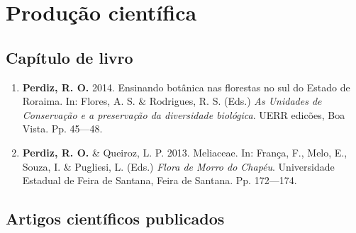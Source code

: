 \documentclass[11pt, a4paper]{awesome-cv}
\begin{document}
\hypertarget{produuxe7uxe3o-cientuxedfica}{%
\section{Produção científica}\label{produuxe7uxe3o-cientuxedfica}}

\hypertarget{capuxedtulo-de-livro}{%
\subsection{Capítulo de livro}\label{capuxedtulo-de-livro}}

\begin{enumerate}
\def\labelenumi{(\arabic{enumi})}
\item
  \textbf{Perdiz, R. O.} 2014. Ensinando botânica nas florestas no sul do Estado de Roraima. In: Flores, A. S. \& Rodrigues, R. S. (Eds.) \emph{As Unidades de Conservação e a preservação da diversidade biológica}. UERR edicões, Boa Vista. Pp. 45---48.
\item
  \textbf{Perdiz, R. O.} \& Queiroz, L. P. 2013. Meliaceae. In: França, F., Melo, E., Souza, I. \& Pugliesi, L. (Eds.) \emph{Flora de Morro do Chapéu}. Universidade Estadual de Feira de Santana, Feira de Santana. Pp. 172---174.
\end{enumerate}

\hypertarget{artigos-cientuxedficos-publicados}{%
\subsection{Artigos científicos publicados}\label{artigos-cientuxedficos-publicados}}
\end{document}

